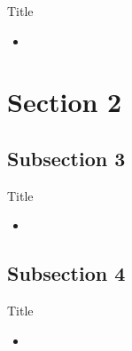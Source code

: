 \documentclass[xcolor=dvipsnames]{beamer}
\begin{document}
\begin{frame}{Title}
    \begin{itemize}
        \item
    \end{itemize}
\end{frame}


\section{Section 2}

\subsection{Subsection 3}

\begin{frame}{Title}
    \begin{itemize}
        \item
    \end{itemize}
\end{frame}

\subsection{Subsection 4}

\begin{frame}{Title}
    \begin{itemize}
        \item
    \end{itemize}
\end{frame}
\end{document}
